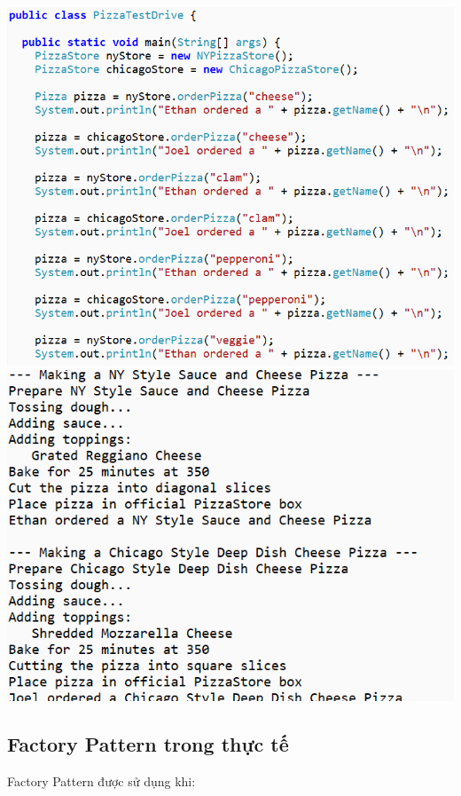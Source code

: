 \begin{center}
	\includegraphics[height=.55\textheight]{GALLEYS/images/chapter5/images8}
	\includegraphics[height=.4\textheight]{GALLEYS/images/chapter5/images9}
\end{center}

\subsection{Factory Pattern trong thực tế}
Factory Pattern được sử dụng khi:

